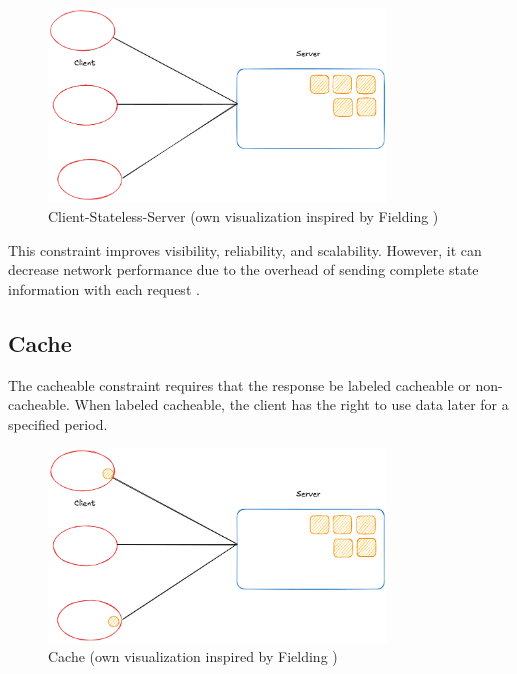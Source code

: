 \begin{figure}[!h]
\centering
\includegraphics[width=0.8\textwidth, keepaspectratio]{figures/stateless.png}
\caption{Client-Stateless-Server (own visualization inspired by Fielding \cite{fielding2000})}
\label{fig:stateless}
\end{figure}

This constraint improves visibility, reliability, and scalability. However, it can decrease network performance due to the overhead of sending complete state information with each request \cite[Section 5.1.3]{fielding2000}.

\subsection{Cache}

The cacheable constraint requires that the response be labeled cacheable or non-cacheable. When labeled cacheable, the client has the right to use data later for a specified period.

\begin{figure}[!h]
\centering
\includegraphics[width=0.8\textwidth, keepaspectratio]{figures/cache.png}
\caption{Cache (own visualization inspired by Fielding \cite{fielding2000})}
\label{fig:cache}
\end{figure}

